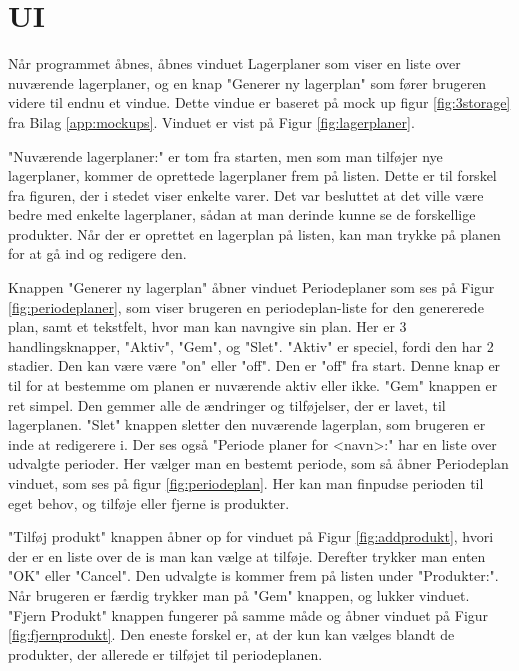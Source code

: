 \clearpage

\section{UI} 
Når programmet åbnes, åbnes vinduet Lagerplaner som viser en liste over nuværende lagerplaner, og en knap "Generer ny lagerplan"  som fører brugeren videre til endnu et vindue. Dette vindue er baseret på mock up figur \ref{fig:3storage} fra Bilag \ref{app:mockups}. Vinduet er vist på Figur \ref{fig:lagerplaner}. 

"Nuværende lagerplaner:"  er tom fra starten, men som man tilføjer nye lagerplaner, kommer de oprettede lagerplaner frem på listen. Dette er til forskel fra figuren, der i stedet viser enkelte varer. Det var besluttet at det ville være bedre med enkelte lagerplaner, sådan at man derinde kunne se de forskellige produkter. 
Når der er oprettet en lagerplan på listen, kan man trykke på planen for at gå ind og redigere den. 

Knappen "Generer ny lagerplan"  åbner vinduet Periodeplaner som ses på Figur \ref{fig:periodeplaner}, som viser brugeren en periodeplan-liste for den genererede plan, samt et tekstfelt, hvor man kan navngive sin plan. Her er 3 handlingsknapper, "Aktiv", "Gem", og "Slet". 
"Aktiv"  er speciel, fordi den har 2 stadier. Den kan være være "on"  eller "off". Den er "off"  fra start. Denne knap er til for at bestemme om planen er nuværende aktiv eller ikke. "Gem" knappen er ret simpel. Den gemmer alle de ændringer og tilføjelser, der er lavet, til lagerplanen. "Slet"  knappen sletter den nuværende lagerplan, som brugeren er inde at redigerere i. 
Der ses også "Periode planer for <navn>:"  har en liste over udvalgte perioder. Her vælger man en bestemt periode, som så åbner Periodeplan vinduet, som ses på figur \ref{fig:periodeplan}. Her kan man finpudse perioden til eget behov, og tilføje eller fjerne is produkter.   

"Tilføj produkt"  knappen åbner op for vinduet på Figur \ref{fig:addprodukt}, hvori der er en liste over de is man kan vælge at tilføje. Derefter trykker man enten "OK" eller "Cancel". Den udvalgte is kommer frem på listen under "Produkter:". Når brugeren er færdig trykker man på "Gem" knappen, og lukker vinduet. 
"Fjern Produkt"  knappen fungerer på samme måde og åbner vinduet på Figur \ref{fig:fjernprodukt}. Den eneste forskel er, at der kun kan vælges blandt de produkter, der allerede er tilføjet til periodeplanen.

